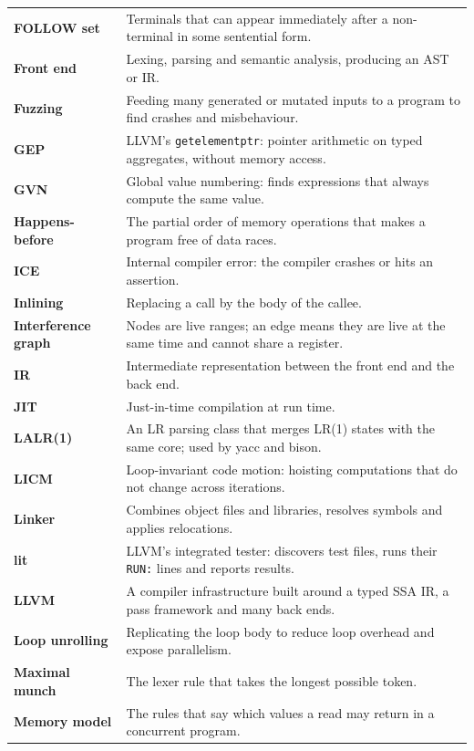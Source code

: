 \documentclass[10pt,a4paper,openany,oneside]{report}
\begin{document}
\begin{center}
\begin{xltabular}{\textwidth}{@{}L{3.6cm}Y@{}}
\textbf{FOLLOW set} & Terminals that can appear immediately after a non-terminal in some sentential form.\\
\textbf{Front end} & Lexing, parsing and semantic analysis, producing an AST or IR.\\
\textbf{Fuzzing} & Feeding many generated or mutated inputs to a program to find crashes and misbehaviour.\\
\textbf{GEP} & LLVM's \texttt{getelementptr}: pointer arithmetic on typed aggregates, without memory access.\\
\textbf{GVN} & Global value numbering: finds expressions that always compute the same value.\\
\textbf{Happens-before} & The partial order of memory operations that makes a program free of data races.\\
\textbf{ICE} & Internal compiler error: the compiler crashes or hits an assertion.\\
\textbf{Inlining} & Replacing a call by the body of the callee.\\
\textbf{Interference graph} & Nodes are live ranges; an edge means they are live at the same time and cannot share a register.\\
\textbf{IR} & Intermediate representation between the front end and the back end.\\
\textbf{JIT} & Just-in-time compilation at run time.\\
\textbf{LALR(1)} & An LR parsing class that merges LR(1) states with the same core; used by yacc and bison.\\
\textbf{LICM} & Loop-invariant code motion: hoisting computations that do not change across iterations.\\
\textbf{Linker} & Combines object files and libraries, resolves symbols and applies relocations.\\
\textbf{lit} & LLVM's integrated tester: discovers test files, runs their \texttt{RUN:} lines and reports results.\\
\textbf{LLVM} & A compiler infrastructure built around a typed SSA IR, a pass framework and many back ends.\\
\textbf{Loop unrolling} & Replicating the loop body to reduce loop overhead and expose parallelism.\\
\textbf{Maximal munch} & The lexer rule that takes the longest possible token.\\
\textbf{Memory model} & The rules that say which values a read may return in a concurrent program.\\

\end{xltabular}
\end{center}
\end{document}
